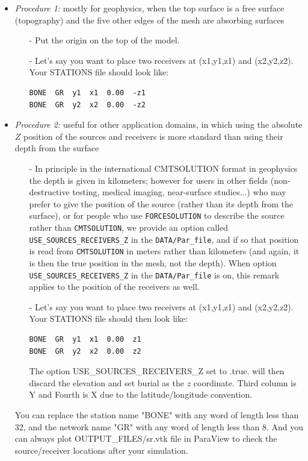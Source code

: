 \begin{itemize}
\item {\it Procedure 1:} mostly for geophysics, when the top surface is a free surface (topography) and the five other edges of the mesh are absorbing surfaces
\begin{enumerate}
\item [-] Put the origin on the top of the model.\newline
\item [-] Let's say you want to place two receivers at (x1,y1,z1) and
(x2,y2,z2). Your STATIONS file should look like:
{\small \begin{verbatim}
BONE  GR  y1  x1  0.00  -z1
BONE  GR  y2  x2  0.00  -z2
\end{verbatim}}
\end{enumerate}

\item {\it Procedure 2:} useful for other application domains, in which using the absolute $Z$ position of the sources and receivers is more standard than using their depth from the surface
\begin{enumerate}
\item [-] In principle in the international CMTSOLUTION format in geophysics
the depth is given in kilometers; however for users in other fields (non-destructive testing, medical imaging, near-surface studies...) who may prefer to give the position of the source (rather than its depth from the surface), or for people who use \texttt{FORCESOLUTION} to describe the source rather than \texttt{CMTSOLUTION}, we provide an option called \texttt{USE\_SOURCES\_RECEIVERS\_Z} in the \texttt{DATA/Par\_file}, and if so that position is read from \texttt{CMTSOLUTION} in meters rather than kilometers (and again, it is then the true position in the mesh, not the depth). When option \texttt{USE\_SOURCES\_RECEIVERS\_Z} in the \texttt{DATA/Par\_file} is on, this remark applies to the position of the receivers as well.\newline
\item [-] Let's say you want to place two receivers at (x1,y1,z1) and
(x2,y2,z2). Your STATIONS file should then look like:
{\small \begin{verbatim}
BONE  GR  y1  x1  0.00  z1
BONE  GR  y2  x2  0.00  z2
\end{verbatim}}
The option USE\_SOURCES\_RECEIVERS\_Z set to .true. will then discard the elevation and set
burial as the $z$ coordinate.
Third column is Y and Fourth is X due to the latitude/longitude convention.\newline
\end{enumerate}

You can replace the station name "BONE" with any word of length less
than 32, and the network name "GR" with any word of length less than
8.
And you can always plot OUTPUT\_FILES/sr.vtk file in ParaView to check the
source/receiver locations after your simulation.\newline
\end{itemize}


